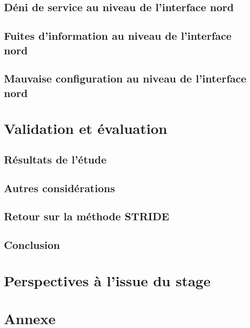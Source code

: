 \documentclass[11pt]{article}
\begin{document}
	\subsection{Déni de service au niveau de l'interface nord}
		
		\newpage
	\subsection{Fuites d'information au niveau de l'interface nord}
		
		\newpage
	\subsection{Mauvaise configuration au niveau de l'interface nord}
		
\newpage
{}
\section{Validation et évaluation}
	\subsection{Résultats de l'étude}
		
	\subsection{Autres considérations}
		
	\subsection{Retour sur la méthode STRIDE}
		
	\newpage
	\subsection{Conclusion}
		
\newpage
{}
\section{Perspectives à l'issue du stage}
	

\newpage
{}
\begin{small}


\end{small}
\nocite{*}

\newpage
\fancyhead[L]{~\\}
\appendix
\section{Annexe}
	
	\newpage
	
	\newpage
	
	\newpage
	
	\newpage
	
\end{document}
